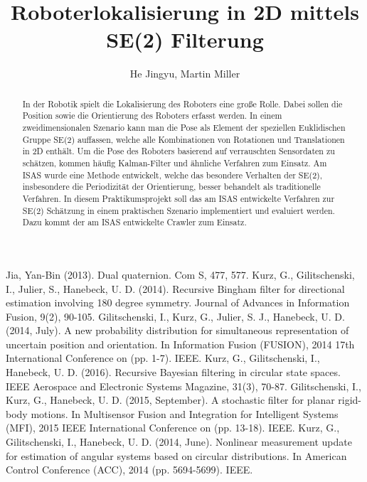 \documentclass[cover]{isas-seminar}
\title{Roboterlokalisierung in 2D mittels SE(2) Filterung}
\author{He Jingyu, Martin Miller}
\begin{document}
\maketitle

\begin{abstract}
In der Robotik spielt die Lokalisierung des Roboters eine große Rolle. Dabei sollen die Position sowie die Orientierung des Roboters erfasst werden. In einem zweidimensionalen Szenario kann man die Pose als Element der speziellen Euklidischen Gruppe SE(2) auffassen, welche alle Kombinationen von Rotationen und Translationen in 2D enthält. Um die Pose des Roboters basierend auf verrauschten Sensordaten zu schätzen, kommen häufig Kalman-Filter und ähnliche Verfahren zum Einsatz. Am ISAS wurde eine Methode entwickelt, welche das besondere Verhalten der SE(2), insbesondere die Periodizität der Orientierung, besser behandelt als traditionelle Verfahren. In diesem Praktikumsprojekt soll das am ISAS entwickelte Verfahren zur SE(2) Schätzung in einem praktischen Szenario implementiert und evaluiert werden. Dazu kommt der am ISAS entwickelte Crawler zum Einsatz.



\end{abstract}
\clearpage
\tableofcontents
\cleardoublepage


\newpage






\begin{thebibliography}{99}

Jia, Yan-Bin (2013). Dual quaternion. Com S, 477, 577.
Kurz, G., Gilitschenski, I., Julier, S.,  Hanebeck, U. D. (2014). Recursive Bingham filter for directional estimation involving 180 degree symmetry. Journal of Advances in Information Fusion, 9(2), 90-105.
Gilitschenski, I., Kurz, G., Julier, S. J.,  Hanebeck, U. D. (2014, July). A new probability distribution for simultaneous representation of uncertain position and orientation. In Information Fusion (FUSION), 2014 17th International Conference on (pp. 1-7). IEEE.
Kurz, G., Gilitschenski, I.,  Hanebeck, U. D. (2016). Recursive Bayesian filtering in circular state spaces. IEEE Aerospace and Electronic Systems Magazine, 31(3), 70-87.
Gilitschenski, I., Kurz, G.,  Hanebeck, U. D. (2015, September). A stochastic filter for planar rigid-body motions. In Multisensor Fusion and Integration for Intelligent Systems (MFI), 2015 IEEE International Conference on (pp. 13-18). IEEE.
Kurz, G., Gilitschenski, I.,  Hanebeck, U. D. (2014, June). Nonlinear measurement update for estimation of angular systems based on circular distributions. In American Control Conference (ACC), 2014 (pp. 5694-5699). IEEE.
\end{thebibliography}
\end{document}
